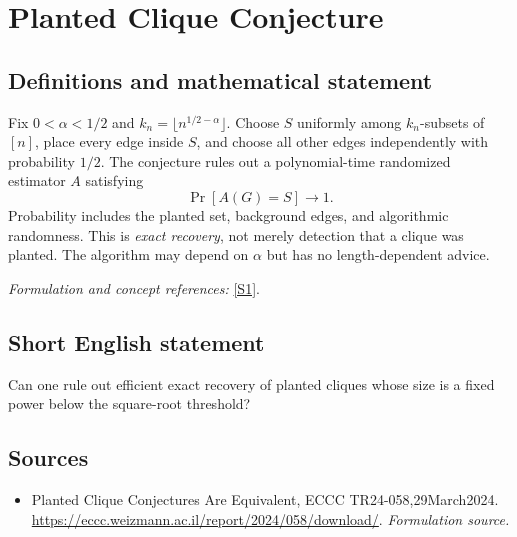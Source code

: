 \documentclass[11pt]{article}
\begin{document}
\section*{\texorpdfstring{Planted Clique Conjecture}{Planted Clique Conjecture}}\label{statement}
\subsection{Definitions and mathematical statement}
Fix $0<\alpha<1/2$ and $k_n=\lfloor n^{1/2-\alpha}\rfloor$. Choose $S$ uniformly among $k_n$-subsets of $[n]$, place every edge inside $S$, and choose all other edges independently with probability $1/2$. The conjecture rules out a polynomial-time randomized estimator $A$ satisfying
\[
 \Pr[A(G)=S]\longrightarrow1.
\]
Probability includes the planted set, background edges, and algorithmic randomness. This is \emph{exact recovery}, not merely detection that a clique was planted. The algorithm may depend on $\alpha$ but has no length-dependent advice.
\par\smallskip\textit{Formulation and concept references:} \href{https://eccc.weizmann.ac.il/report/2024/058/download/}{[S1]}.

\subsection{Short English statement}
Can one rule out efficient exact recovery of planted cliques whose size is a fixed power below the square-root threshold?
\subsection{Sources}
\begin{itemize}
\item[S1]Planted Clique Conjectures Are Equivalent, ECCC TR24-058,29March2024.
\url{https://eccc.weizmann.ac.il/report/2024/058/download/}.
\textit{Formulation source.}
\end{itemize}
\end{document}
